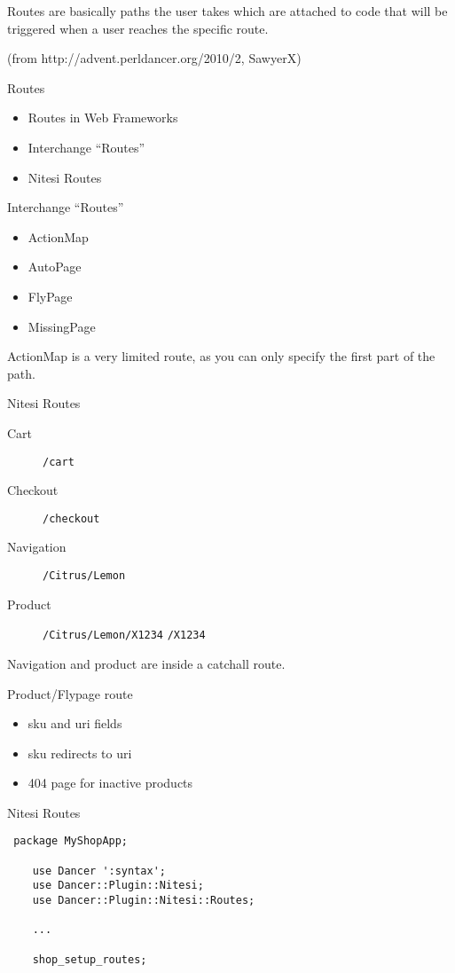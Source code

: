 Routes are basically paths the user takes which are attached to code that
will be triggered when a user reaches the specific route.

(from http://advent.perldancer.org/2010/2, SawyerX)

\begin{frame}{Routes}
\begin{itemize}
\item Routes in Web Frameworks
\item Interchange ``Routes''
\item Nitesi Routes
\end{itemize}
\end{frame}


\begin{frame}{Interchange ``Routes''}
\begin{itemize}
\item ActionMap
\item AutoPage
\item FlyPage
\item MissingPage
\end{itemize}
\end{frame}

ActionMap is a very limited route, as you can only
specify the first part of the path.

\begin{frame}[fragile]{Nitesi Routes}
\begin{description}
\item[Cart] \verb|/cart| 
\item[Checkout] \verb|/checkout|
\item[Navigation] \verb|/Citrus/Lemon|
\item[Product] \verb|/Citrus/Lemon/X1234| \verb|/X1234|
\end{description}
\end{frame}

Navigation and product are inside a catchall route.

\begin{frame}{Product/Flypage route}
\begin{itemize}
\item sku and uri fields
\item sku redirects to uri
\item 404 page for inactive products
\end{itemize}
\end{frame}

\begin{frame}[fragile]{Nitesi Routes}
\begin{lstlisting}
 package MyShopApp;

    use Dancer ':syntax';
    use Dancer::Plugin::Nitesi;
    use Dancer::Plugin::Nitesi::Routes;

    ...

    shop_setup_routes;
\end{lstlisting}
\end{frame}

